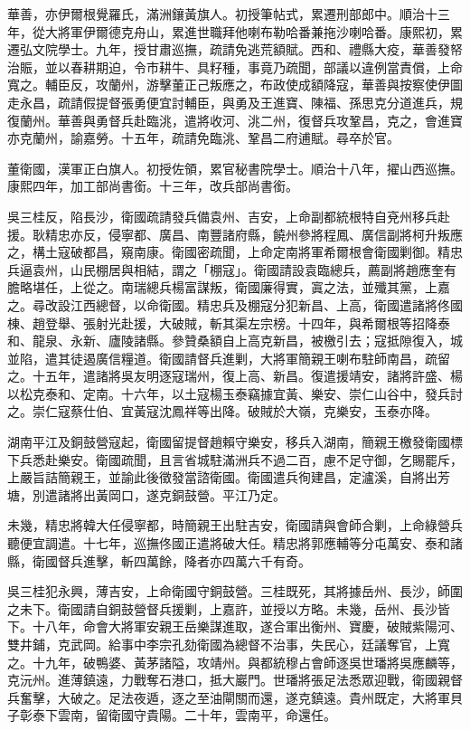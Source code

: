 \begin{pinyinscope}
華善，亦伊爾根覺羅氏，滿洲鑲黃旗人。初授筆帖式，累遷刑部郎中。順治十三年，從大將軍伊爾德克舟山，累進世職拜他喇布勒哈番兼拖沙喇哈番。康熙初，累遷弘文院學士。九年，授甘肅巡撫，疏請免逃荒額賦。西和、禮縣大疫，華善發帑治賑，並以春耕期迫，令市耕牛、具籽種，事竟乃疏聞，部議以違例當責償，上命寬之。輔臣反，攻蘭州，游擊董正己叛應之，布政使成額降寇，華善與按察使伊圖走永昌，疏請假提督張勇便宜討輔臣，與勇及王進寶、陳福、孫思克分道進兵，規復蘭州。華善與勇督兵赴臨洮，遣將收河、洮二州，復督兵攻鞏昌，克之，會進寶亦克蘭州，諭嘉勞。十五年，疏請免臨洮、鞏昌二府逋賦。尋卒於官。

董衛國，漢軍正白旗人。初授佐領，累官秘書院學士。順治十八年，擢山西巡撫。康熙四年，加工部尚書銜。十三年，改兵部尚書銜。

吳三桂反，陷長沙，衛國疏請發兵備袁州、吉安，上命副都統根特自兗州移兵赴援。耿精忠亦反，侵寧都、廣昌、南豐諸府縣，饒州參將程鳳、廣信副將柯升叛應之，構土寇破都昌，窺南康。衛國密疏聞，上命定南將軍希爾根會衛國剿御。精忠兵逼袁州，山民棚居與相結，謂之「棚寇」。衛國請設袁臨總兵，薦副將趙應奎有膽略堪任，上從之。南瑞總兵楊富謀叛，衛國廉得實，寘之法，並殲其黨，上嘉之。尋改設江西總督，以命衛國。精忠兵及棚寇分犯新昌、上高，衛國遣諸將佟國棟、趙登舉、張射光赴援，大破賊，斬其渠左宗榜。十四年，與希爾根等招降泰和、龍泉、永新、廬陵諸縣。參贊桑額自上高克新昌，被檄引去；寇抵隙復入，城並陷，遣其徒遏廣信糧道。衛國請督兵進剿，大將軍簡親王喇布駐師南昌，疏留之。十五年，遣諸將吳友明逐寇瑞州，復上高、新昌。復遣援靖安，諸將許盛、楊以松克泰和、定南。十六年，以土寇楊玉泰竊據宜黃、樂安、崇仁山谷中，發兵討之。崇仁寇蔡仕伯、宜黃寇沈鳳祥等出降。破賊於大嶺，克樂安，玉泰亦降。

湖南平江及銅鼓營寇起，衛國留提督趙賴守樂安，移兵入湖南，簡親王檄發衛國標下兵悉赴樂安。衛國疏聞，且言省城駐滿洲兵不過二百，慮不足守御，乞賜罷斥，上嚴旨詰簡親王，並諭此後徵發當諮衛國。衛國遣兵徇建昌，定瀘溪，自將出芳塘，別遣諸將出黃岡口，遂克銅鼓營。平江乃定。

未幾，精忠將韓大任侵寧都，時簡親王出駐吉安，衛國請與會師合剿，上命綠營兵聽便宜調遣。十七年，巡撫佟國正遣將破大任。精忠將郭應輔等分屯萬安、泰和諸縣，衛國督兵進擊，斬四萬餘，降者亦四萬六千有奇。

吳三桂犯永興，薄吉安，上命衛國守銅鼓營。三桂既死，其將據岳州、長沙，師圍之未下。衛國請自銅鼓營督兵援剿，上嘉許，並授以方略。未幾，岳州、長沙皆下。十八年，命會大將軍安親王岳樂謀進取，遂合軍出衡州、寶慶，破賊紫陽河、雙井鋪，克武岡。給事中李宗孔劾衛國為總督不治事，失民心，廷議奪官，上寬之。十九年，破鴨婆、黃茅諸隘，攻靖州。與都統穆占會師逐吳世璠將吳應麟等，克沅州。進薄鎮遠，力戰奪石港口，抵大巖門。世璠將張足法悉眾迎戰，衛國親督兵奮擊，大破之。足法夜遁，逐之至油閘關而還，遂克鎮遠。貴州既定，大將軍貝子彰泰下雲南，留衛國守貴陽。二十年，雲南平，命還任。


\end{pinyinscope}
